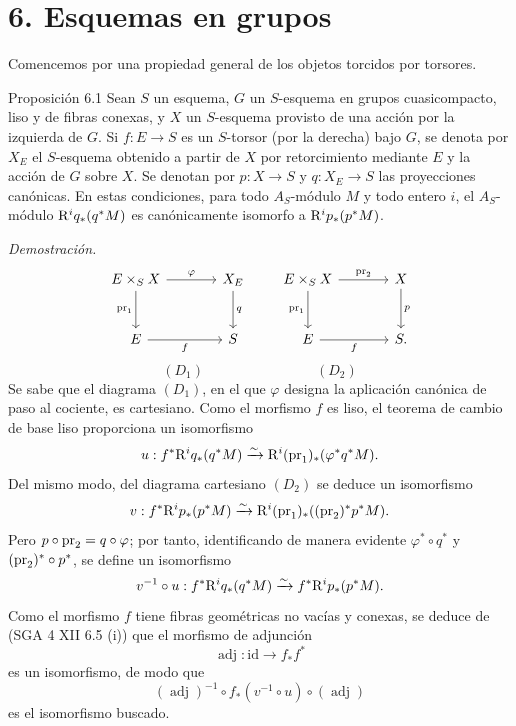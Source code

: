 \section*{6. Esquemas en grupos}

Comencemos por una propiedad general de los objetos torcidos por torsores.

\begin{statement}{Proposición 6.1}
Sean $S$ un esquema, $G$ un $S$-esquema en grupos cuasicompacto, liso y de fibras conexas, y $X$ un $S$-esquema provisto de una acción por la izquierda de $G$. Si $f:E\to S$ es un $S$-torsor (por la derecha) bajo $G$, se denota por $X_E$ el $S$-esquema obtenido a partir de $X$ por retorcimiento mediante $E$ y la acción de $G$ sobre $X$. Se denotan por $p:X\to S$ y $q:X_E\to S$ las proyecciones canónicas. En estas condiciones, para todo $A_S$-módulo $M$ y todo entero $i$, el $A_S$-módulo $\mathrm{R}^iq_*(q^*M)$ es canónicamente isomorfo a $\mathrm{R}^ip_*(p^*M)$.
\end{statement}

\emph{Demostración.}
\[
\begin{tikzcd}[column sep=large,row sep=large]
E\times_S X \arrow[r,"\varphi"] \arrow[d,"\pr_1"'] & X_E \arrow[d,"q"]\\
E \arrow[r,"f"'] & S
\end{tikzcd}
\qquad
\begin{tikzcd}[column sep=large,row sep=large]
E\times_S X \arrow[r,"\pr_2"] \arrow[d,"\pr_1"'] & X \arrow[d,"p"]\\
E \arrow[r,"f"'] & S .
\end{tikzcd}
\]
\[
(D_1)\qquad\qquad\qquad\qquad(D_2)
\]
Se sabe que el diagrama $(D_1)$, en el que $\varphi$ designa la aplicación canónica de paso al cociente, es cartesiano. Como el morfismo $f$ es liso, el teorema de cambio de base liso proporciona un isomorfismo
\[
u:f^*\mathrm{R}^iq_*(q^*M)\xrightarrow{\sim}\mathrm{R}^i(\operatorname{pr}_1)_*(\varphi^*q^*M).
\]
Del mismo modo, del diagrama cartesiano $(D_2)$ se deduce un isomorfismo
\[
v:f^*\mathrm{R}^ip_*(p^*M)\xrightarrow{\sim}\mathrm{R}^i(\operatorname{pr}_1)_*((\operatorname{pr}_2)^*p^*M).
\]
Pero $p\circ\operatorname{pr}_2=q\circ\varphi$; por tanto, identificando de manera evidente $\varphi^*\circ q^*$ y $(\operatorname{pr}_2)^*\circ p^*$, se define un isomorfismo
\[
v^{-1}\circ u:f^*\mathrm{R}^iq_*(q^*M)\xrightarrow{\sim} f^*\mathrm{R}^ip_*(p^*M).
\]
Como el morfismo $f$ tiene fibras geométricas no vacías y conexas, se deduce de (SGA 4 XII 6.5 (i)) que el morfismo de adjunción
\[
\operatorname{adj}:\mathrm{id}\to f_*f^*
\]
es un isomorfismo, de modo que
\[
(\operatorname{adj})^{-1}\circ f_*(v^{-1}\circ u)\circ(\operatorname{adj})
\]
es el isomorfismo buscado.
